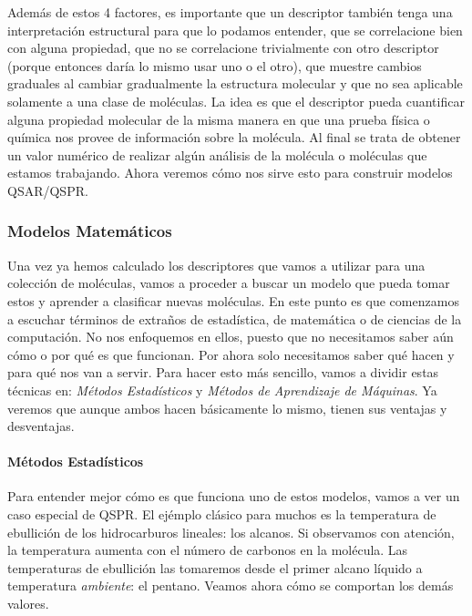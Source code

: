 \documentclass[10pt,letterpaper]{article}
\begin{document}
Adem\'as de estos 4 factores, es importante que un descriptor tambi\'en tenga una interpretaci\'on estructural para que lo podamos entender, que se correlacione bien con alguna propiedad, que no se correlacione trivialmente con otro descriptor (porque entonces dar\'ia lo mismo usar uno o el otro), que muestre cambios graduales al cambiar gradualmente la estructura molecular y que no sea aplicable solamente a una clase de mol\'eculas. La idea es que el descriptor pueda cuantificar alguna propiedad molecular de la misma manera en que una prueba f\'isica o qu\'imica nos provee de informaci\'on sobre la mol\'ecula. Al final se trata de obtener un valor num\'erico de realizar alg\'un an\'alisis de la mol\'ecula o mol\'eculas que estamos trabajando. Ahora veremos c\'omo nos sirve esto para construir modelos QSAR/QSPR.

\subsubsection{Modelos Matem\'aticos}
Una vez ya hemos calculado los descriptores que vamos a utilizar para una colecci\'on de mol\'eculas, vamos a proceder a buscar un modelo que pueda tomar estos y aprender a clasificar nuevas mol\'eculas. En este punto es que comenzamos a escuchar t\'erminos de extra\~nos de estad\'istica, de matem\'atica o de ciencias de la computaci\'on. No nos enfoquemos en ellos, puesto que no necesitamos saber a\'un c\'omo o por qu\'e es que funcionan. Por ahora solo necesitamos saber qu\'e hacen y para qu\'e nos van a servir. Para hacer esto m\'as sencillo, vamos a dividir estas t\'ecnicas en: \emph{M\'etodos Estad\'isticos} y \emph{M\'etodos de Aprendizaje de M\'aquinas}. Ya veremos que aunque ambos hacen b\'asicamente lo mismo, tienen sus ventajas y desventajas.

\paragraph{M\'etodos Estad\'isticos}
Para entender mejor c\'omo es que funciona uno de estos modelos, vamos a ver un caso especial de QSPR. El ej\'emplo cl\'asico para muchos es la temperatura de ebullici\'on de los hidrocarburos lineales: los alcanos. Si observamos con atenci\'on, la temperatura aumenta con el n\'umero de carbonos en la mol\'ecula. Las temperaturas de ebullici\'on las tomaremos desde el primer alcano l\'iquido a temperatura \textit{ambiente}: el pentano. Veamos ahora c\'omo se comportan los dem\'as valores.
\end{document}
